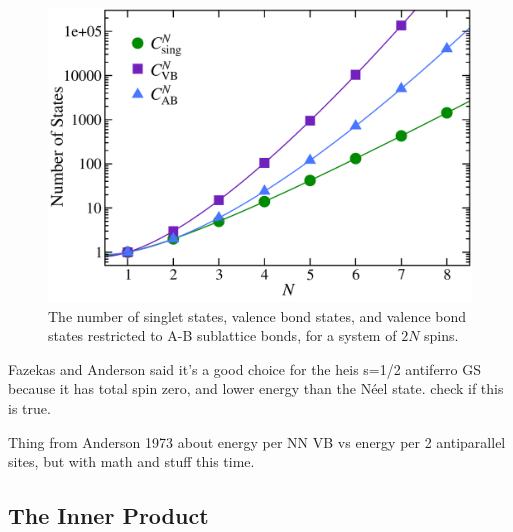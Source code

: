 \begin{figure} {  
\centering
\includegraphics [width=4.5in]{./figures/made/fact.pdf} 
\caption[Comparison of number of states]{
The number of singlet states, valence bond states, and valence bond states restricted to A-B sublattice bonds, for a system of $2N$ spins.}
 \label{statess}
 }
\end{figure}

{\color{red} Fazekas and Anderson said it's a good choice for the heis s=1/2 antiferro GS
because it has total spin zero, and lower energy than the N\'eel state.  check if this is true.}

{\color{red} Thing from Anderson 1973 about energy per NN VB vs energy per 2 antiparallel sites,
but with math and stuff this time.}

\subsection{The Inner Product}

